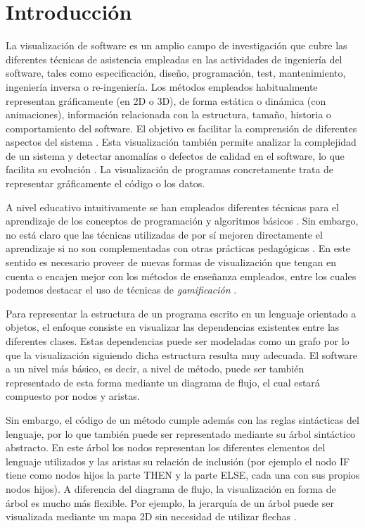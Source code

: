 \documentclass{llncs}
\begin{document}
\section{Introducción}
\label{sec:intro}
La visualización de software es un amplio campo de investigación que cubre las diferentes técnicas de asistencia empleadas en las actividades de ingeniería del software, tales como especificación, diseño, programación, test, mantenimiento, ingeniería inversa o re-ingeniería. Los métodos empleados habitualmente representan gráficamente (en 2D o 3D), de forma estática o dinámica (con animaciones), información relacionada con la estructura, tamaño, historia o comportamiento del software. El objetivo es facilitar la comprensión de diferentes aspectos del sistema \cite{baecker1988enhancing}. Esta visualización también permite analizar la complejidad de un sistema y detectar anomalías o defectos de calidad en el software, lo que facilita su evolución \cite{softwarevisualization}. La visualización de programas concretamente trata de representar gráficamente el código o los datos. 

A nivel educativo intuitivamente se han empleados diferentes técnicas para el aprendizaje de los conceptos de programación y algoritmos básicos \cite{urquiza2009survey}. Sin embargo, no está claro que las técnicas utilizadas de por sí mejoren directamente el aprendizaje si no son complementadas con otras prácticas pedagógicas \cite{naps2002exploring}. En este sentido es necesario proveer de nuevas formas de visualización que tengan en cuenta o encajen mejor con los métodos de enseñanza empleados, entre los cuales podemos destacar el uso de técnicas de \emph{gamificación} \cite{salen2011quest}.

Para representar la estructura de un programa escrito en un lenguaje orientado a objetos, el enfoque consiste en visualizar las dependencias existentes entre las diferentes clases. Estas dependencias puede ser modeladas como un grafo por lo que la visualización siguiendo dicha estructura resulta muy adecuada. El software a un nivel más básico, es decir, a nivel de método, puede ser también representado de esta forma mediante un diagrama de flujo, el cual estará compuesto por nodos y aristas.

Sin embargo, el código de un método cumple además con las reglas sintácticas del lenguaje, por lo que también puede ser representado mediante su árbol sintáctico abstracto. En este árbol los nodos representan los diferentes elementos del lenguaje utilizados y las aristas su relación de inclusión (por ejemplo el nodo IF tiene como nodos hijos la parte THEN y la parte ELSE, cada una con sus propios nodos hijos). A diferencia del diagrama de flujo, la visualización en forma de árbol es mucho más flexible. Por ejemplo, la jerarquía de un árbol puede ser visualizada mediante un mapa 2D sin necesidad de utilizar flechas \cite{softwarevisualization}.
\end{document}
